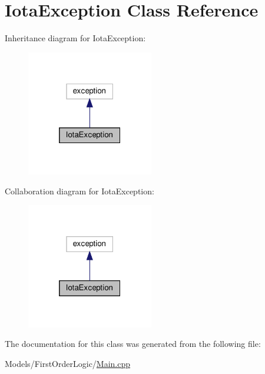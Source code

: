 \hypertarget{class_iota_exception}{}\section{Iota\+Exception Class Reference}
\label{class_iota_exception}


Inheritance diagram for Iota\+Exception\+:
\nopagebreak
\begin{figure}[H]
\begin{center}
\leavevmode
\includegraphics[width=157pt]{class_iota_exception__inherit__graph}
\end{center}
\end{figure}


Collaboration diagram for Iota\+Exception\+:
\nopagebreak
\begin{figure}[H]
\begin{center}
\leavevmode
\includegraphics[width=157pt]{class_iota_exception__coll__graph}
\end{center}
\end{figure}


The documentation for this class was generated from the following file\+:\begin{DoxyCompactItemize}
\item 
Models/\+First\+Order\+Logic/\hyperlink{_models_2_first_order_logic_2_main_8cpp}{Main.\+cpp}\end{DoxyCompactItemize}
